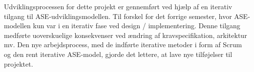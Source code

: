 \documentclass[Rapport/Rapport_main.tex]{subfiles}
\begin{document}
Udviklingsprocessen for dette projekt er gennemført ved hjælp af en iterativ tilgang til ASE-udviklingsmodellen. Til forskel for det forrige semester, hvor ASE-modellen kun var i en iterativ fase ved design / implementering. Denne tilgang medførte uoverskuelige konsekvenser ved ændring af kravspecifikation, arkitektur mv. Den nye arbejdsprocess, med de indførte iterative metoder i form af Scrum og den rent iterative ASE-model, gjorde det lettere, at lave nye tilføjelser til projektet.  
\end{document}

